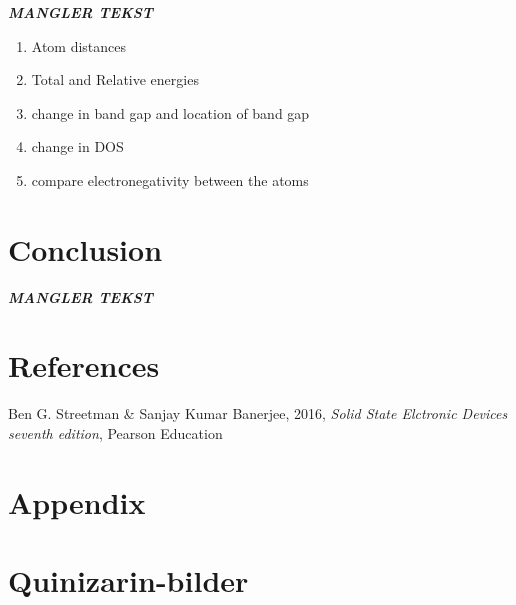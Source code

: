 \documentclass{article}
\begin{document}
    \textbf{\textit{MANGLER TEKST}}

    \begin{enumerate}
        \item Atom distances
        \item Total and Relative energies
        \item change in band gap and location of band gap
        \item change in DOS
        \item compare electronegativity between the atoms
    \end{enumerate}




\vspace{1cm}

\section{Conclusion}    \label{sec:Conclusion}

  \textbf{\textit{MANGLER TEKST}}


\vspace{1cm}

\section{References} \label{sec:References}

    \begin{thebibliography}{}

    Ben G. Streetman \& Sanjay Kumar Banerjee, 2016, \textit{Solid State Elctronic Devices seventh edition}, Pearson Education


    \end{thebibliography}



\appendix

\section*{Appendix} \label{sec:Appendix}

\section{Quinizarin-bilder}
\end{document}

